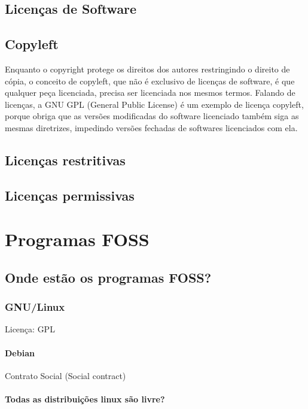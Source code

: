 \documentclass[12pt, a4paper]{report}
\begin{document}
\section{Licenças de Software}

\section{Copyleft}

Enquanto o copyright protege os direitos dos autores restringindo o direito de cópia, o conceito de copyleft, que não é exclusivo de licenças de software, é que qualquer peça licenciada, precisa ser licenciada nos mesmos termos. Falando de licenças, a GNU GPL (General Public License) é um exemplo de licença copyleft, porque obriga que as versões modificadas do software licenciado também siga as mesmas diretrizes, impedindo versões fechadas de softwares licenciados com ela.

\section{Licenças restritivas}

\section{Licenças permissivas}

\chapter{Programas FOSS}

\section{Onde estão os programas FOSS?}

\subsection{GNU/Linux}

Licença: GPL

\subsubsection{Debian}

Contrato Social (Social contract) 

\subsubsection{Todas as distribuições linux são livre?}
\end{document}
